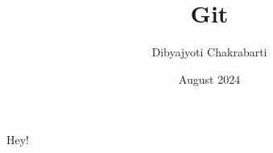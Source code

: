 \documentclass{article}
\title{Git}
\author{Dibyajyoti Chakrabarti}
\date{August 2024}
\begin{document}
\maketitle

Hey!
\end{document}
